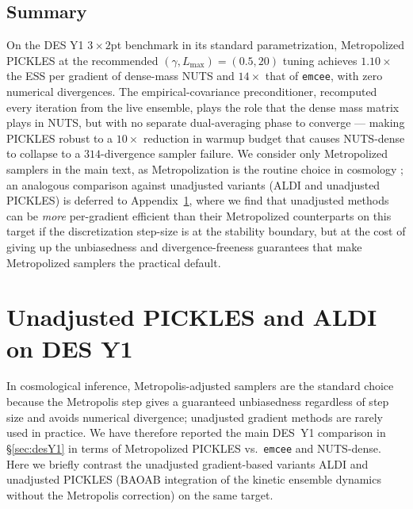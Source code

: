\documentclass{article}
\begin{document}
\subsection{Summary}

On the DES Y1 $3\times 2$pt benchmark in its standard parametrization,
Metropolized PICKLES at the recommended $(\gamma, L_{\max}) = (0.5, 20)$
tuning achieves $1.10\!\times$ the ESS per gradient of dense-mass NUTS
and $14\!\times$ that of \texttt{emcee}, with zero numerical
divergences. The empirical-covariance preconditioner, recomputed every
iteration from the live ensemble, plays the role that the dense mass
matrix plays in NUTS, but with no separate dual-averaging phase to
converge — making PICKLES robust to a $10\!\times$ reduction in warmup
budget that causes NUTS-dense to collapse to a $314$-divergence sampler
failure. We consider only Metropolized samplers in the main text, as
Metropolization is the routine choice in cosmology
\cite{campagne2023jax,foreman2013emcee}; an analogous comparison
against unadjusted variants (ALDI \cite{garbuno2020affine} and
unadjusted PICKLES) is deferred to Appendix~\ref{app:desUnadjusted},
where we find that unadjusted methods can be \emph{more} per-gradient
efficient than their Metropolized counterparts on this target if the
discretization step-size is at the stability boundary, but at the
cost of giving up the unbiasedness and divergence-freeness guarantees
that make Metropolized samplers the practical default.

\appendix

\section{Unadjusted PICKLES and ALDI on DES Y1}\label{app:desUnadjusted}

In cosmological inference, Metropolis-adjusted samplers are the
standard choice because the Metropolis step gives a guaranteed
unbiasedness regardless of step size and avoids numerical divergence;
unadjusted gradient methods are rarely used in practice. We have
therefore reported the main DES~Y1 comparison in
\S\ref{sec:desY1} in terms of Metropolized PICKLES vs.\ \texttt{emcee}
and NUTS-dense. Here we briefly contrast the unadjusted
gradient-based variants ALDI \cite{garbuno2020affine} and unadjusted
PICKLES (BAOAB integration of the kinetic ensemble dynamics without
the Metropolis correction) on the same target.
\end{document}
